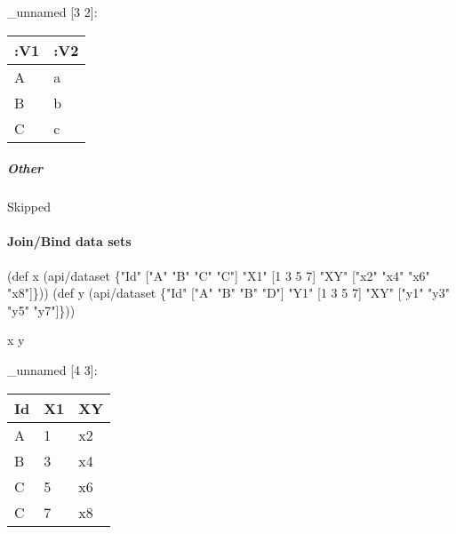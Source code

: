 \documentclass[]{article}
\newenvironment{Shaded}{\begin{snugshade}}{\end{snugshade}}
\newcommand{\BuiltInTok}[1]{#1}
\newcommand{\DecValTok}[1]{\textcolor[rgb]{0.00,0.00,0.81}{#1}}
\newcommand{\FunctionTok}[1]{\textcolor[rgb]{0.00,0.00,0.00}{#1}}
\newcommand{\NormalTok}[1]{#1}
\newcommand{\StringTok}[1]{\textcolor[rgb]{0.31,0.60,0.02}{#1}}
\let\oldparagraph\paragraph
\renewcommand{\paragraph}[1]{\oldparagraph{#1}\mbox{}}
\let\oldsubparagraph\subparagraph
\renewcommand{\subparagraph}[1]{\oldsubparagraph{#1}\mbox{}}
\begin{document}
\_unnamed {[}3 2{]}:

\begin{longtable}[]{@{}ll@{}}
\toprule
:V1 & :V2\tabularnewline
\midrule
\endhead
A & a\tabularnewline
B & b\tabularnewline
C & c\tabularnewline
\bottomrule
\end{longtable}

\hypertarget{other-1}{%
\subparagraph{Other}\label{other-1}}

Skipped

\hypertarget{joinbind-data-sets}{%
\paragraph{Join/Bind data sets}\label{joinbind-data-sets}}

\begin{Shaded}
\begin{Highlighting}[]
\NormalTok{(}\BuiltInTok{def}\FunctionTok{ x }\NormalTok{(api/dataset \{}\StringTok{"Id"}\NormalTok{ [}\StringTok{"A"} \StringTok{"B"} \StringTok{"C"} \StringTok{"C"}\NormalTok{]}
                     \StringTok{"X1"}\NormalTok{ [}\DecValTok{1} \DecValTok{3} \DecValTok{5} \DecValTok{7}\NormalTok{]}
                     \StringTok{"XY"}\NormalTok{ [}\StringTok{"x2"} \StringTok{"x4"} \StringTok{"x6"} \StringTok{"x8"}\NormalTok{]\}))}
\NormalTok{(}\BuiltInTok{def}\FunctionTok{ y }\NormalTok{(api/dataset \{}\StringTok{"Id"}\NormalTok{ [}\StringTok{"A"} \StringTok{"B"} \StringTok{"B"} \StringTok{"D"}\NormalTok{]}
                     \StringTok{"Y1"}\NormalTok{ [}\DecValTok{1} \DecValTok{3} \DecValTok{5} \DecValTok{7}\NormalTok{]}
                     \StringTok{"XY"}\NormalTok{ [}\StringTok{"y1"} \StringTok{"y3"} \StringTok{"y5"} \StringTok{"y7"}\NormalTok{]\}))}
\end{Highlighting}
\end{Shaded}

\begin{Shaded}
\begin{Highlighting}[]
\NormalTok{x y}
\end{Highlighting}
\end{Shaded}

\_unnamed {[}4 3{]}:

\begin{longtable}[]{@{}lll@{}}
\toprule
Id & X1 & XY\tabularnewline
\midrule
\endhead
A & 1 & x2\tabularnewline
B & 3 & x4\tabularnewline
C & 5 & x6\tabularnewline
C & 7 & x8\tabularnewline
\bottomrule
\end{longtable}
\end{document}
